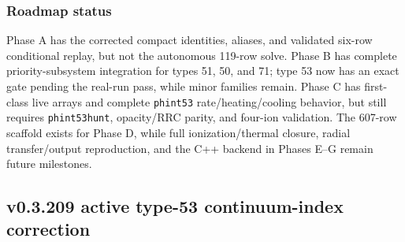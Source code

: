 \documentclass[11pt]{article}
\begin{document}
\subsubsection{Roadmap status}

Phase A has the corrected compact identities, aliases, and validated six-row conditional replay, but not the autonomous 119-row solve. Phase B has complete priority-subsystem integration for types 51, 50, and 71; type 53 now has an exact gate pending the real-run pass, while minor families remain. Phase C has first-class live arrays and complete \texttt{phint53} rate/heating/cooling behavior, but still requires \texttt{phint53hunt}, opacity/RRC parity, and four-ion validation. The 607-row scaffold exists for Phase D, while full ionization/thermal closure, radial transfer/output reproduction, and the C++ backend in Phases E--G remain future milestones.

\subsection{v0.3.209 active type-53 continuum-index correction}
\end{document}
